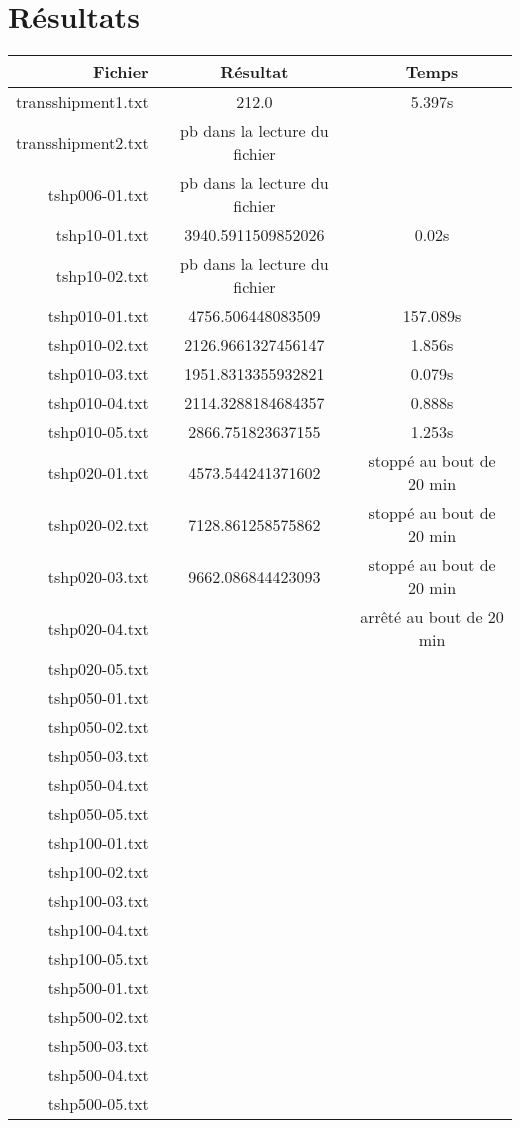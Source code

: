 \documentclass[a4paper,12pt]{article}
\begin{document}
\section{R\'esultats}

\begin{center}
 \begin{tabular}{r | c | c}
\textbf{Fichier} & \textbf{R\'esultat} & \textbf{Temps} \\ \hline
transshipment1.txt & 212.0 & 5.397s \\
transshipment2.txt & pb dans la lecture du fichier & \\
tshp006-01.txt & pb dans la lecture du fichier & \\
tshp10-01.txt & 3940.5911509852026 & 0.02s \\
tshp10-02.txt & pb dans la lecture du fichier & \\
tshp010-01.txt & 4756.506448083509 & 157.089s \\
tshp010-02.txt & 2126.9661327456147 & 1.856s \\
tshp010-03.txt & 1951.8313355932821 & 0.079s \\
tshp010-04.txt & 2114.3288184684357 & 0.888s \\
tshp010-05.txt & 2866.751823637155 & 1.253s \\
tshp020-01.txt & 4573.544241371602 & stopp\'e au bout de 20 min \\
tshp020-02.txt & 7128.861258575862 & stopp\'e au bout de 20 min \\
tshp020-03.txt & 9662.086844423093 & stopp\'e au bout de 20 min \\
tshp020-04.txt & & arrêté au bout de 20 min \\
tshp020-05.txt & & \\
tshp050-01.txt & & \\
tshp050-02.txt & & \\
tshp050-03.txt & & \\
tshp050-04.txt & & \\
tshp050-05.txt & & \\
tshp100-01.txt & & \\
tshp100-02.txt & & \\
tshp100-03.txt & & \\
tshp100-04.txt & & \\
tshp100-05.txt & & \\
tshp500-01.txt & & \\
tshp500-02.txt & & \\
tshp500-03.txt & & \\
tshp500-04.txt & & \\
tshp500-05.txt & & \\
  
 \end{tabular}

\end{center}
\end{document}
